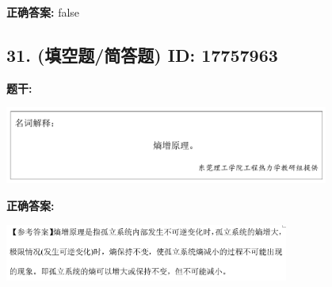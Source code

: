 \documentclass[12pt]{article}
\begin{document}
\textbf{正确答案:}
false

\vspace{0.5em}\hrulefill\vspace{1em}

\subsection*{31. (填空题/简答题) \small ID: 17757963}

\textbf{题干:}


\begin{center}\includegraphics[width=0.8\textwidth, height=0.25\textheight, keepaspectratio]{question_31_17757963/title_img_1.png}\end{center}

\textbf{正确答案:}

\begin{center}\includegraphics[width=0.7\textwidth, height=0.2\textheight, keepaspectratio]{question_31_17757963/correct_answer_1_img_1.png}\end{center}

\vspace{0.5em}\hrulefill\vspace{1em}
\end{document}
